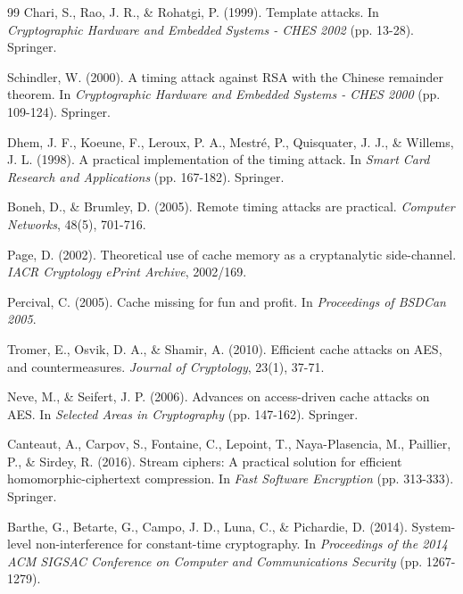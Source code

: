 \documentclass[12pt,a4paper]{article}
\theoremstyle{definition}
\begin{document}
\begin{thebibliography}{99}
Chari, S., Rao, J. R., \& Rohatgi, P. (1999).
\newblock Template attacks.
\newblock In \textit{Cryptographic Hardware and Embedded Systems - CHES 2002} (pp. 13-28). Springer.

Schindler, W. (2000).
\newblock A timing attack against RSA with the Chinese remainder theorem.
\newblock In \textit{Cryptographic Hardware and Embedded Systems - CHES 2000} (pp. 109-124). Springer.

Dhem, J. F., Koeune, F., Leroux, P. A., Mestré, P., Quisquater, J. J., \& Willems, J. L. (1998).
\newblock A practical implementation of the timing attack.
\newblock In \textit{Smart Card Research and Applications} (pp. 167-182). Springer.

Boneh, D., \& Brumley, D. (2005).
\newblock Remote timing attacks are practical.
\newblock \textit{Computer Networks}, 48(5), 701-716.

Page, D. (2002).
\newblock Theoretical use of cache memory as a cryptanalytic side-channel.
\newblock \textit{IACR Cryptology ePrint Archive}, 2002/169.

Percival, C. (2005).
\newblock Cache missing for fun and profit.
\newblock In \textit{Proceedings of BSDCan 2005}.

Tromer, E., Osvik, D. A., \& Shamir, A. (2010).
\newblock Efficient cache attacks on AES, and countermeasures.
\newblock \textit{Journal of Cryptology}, 23(1), 37-71.

Neve, M., \& Seifert, J. P. (2006).
\newblock Advances on access-driven cache attacks on AES.
\newblock In \textit{Selected Areas in Cryptography} (pp. 147-162). Springer.

Canteaut, A., Carpov, S., Fontaine, C., Lepoint, T., Naya-Plasencia, M., Paillier, P., \& Sirdey, R. (2016).
\newblock Stream ciphers: A practical solution for efficient homomorphic-ciphertext compression.
\newblock In \textit{Fast Software Encryption} (pp. 313-333). Springer.

Barthe, G., Betarte, G., Campo, J. D., Luna, C., \& Pichardie, D. (2014).
\newblock System-level non-interference for constant-time cryptography.
\newblock In \textit{Proceedings of the 2014 ACM SIGSAC Conference on Computer and Communications Security} (pp. 1267-1279).


\end{thebibliography}
\end{document}

